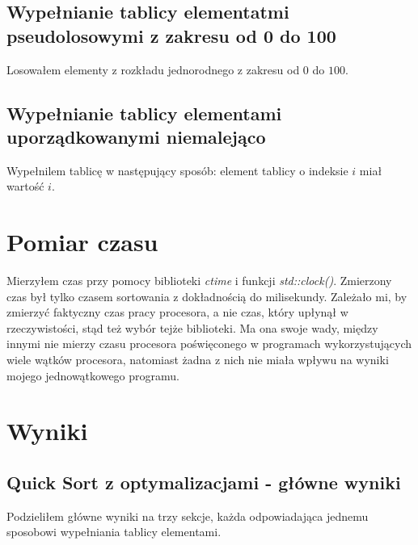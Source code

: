 \documentclass{article}
\begin{document}
    \subsection{Wypełnianie tablicy elementatmi pseudolosowymi z zakresu od 0 do 100}
    Losowałem elementy z rozkładu jednorodnego z zakresu od \(0\) do \(100\).
    
    \subsection{Wypełnianie tablicy elementami uporządkowanymi niemalejąco}
    Wypełnilem tablicę w następujący sposób: element tablicy o indeksie \(i\) miał wartość \(i\).
    
\section{Pomiar czasu}
Mierzyłem czas przy pomocy biblioteki \textit{ctime} i funkcji \textit{std::clock()}. Zmierzony czas był tylko czasem sortowania z dokładnością do milisekundy. Zależało mi, by zmierzyć faktyczny czas pracy procesora, a nie czas, który upłynął w rzeczywistości, stąd też wybór tejże biblioteki. Ma ona swoje wady, między innymi nie mierzy czasu procesora poświęconego w programach wykorzystujących wiele wątków procesora, natomiast żadna z nich nie miała wpływu na wyniki mojego jednowątkowego programu.

\section{Wyniki}
    \subsection{Quick Sort z optymalizacjami - główne wyniki}
    Podzieliłem główne wyniki na trzy sekcje, każda odpowiadająca jednemu sposobowi wypełniania tablicy elementami.
\end{document}
